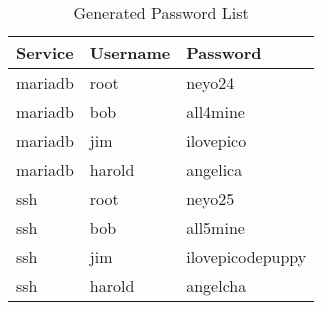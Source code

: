 \begin{table}[h!]
\centering
\begin{tabularx}{0.5\textwidth}{|>{\raggedright\arraybackslash}X|>{\raggedright\arraybackslash}X|>{\raggedright\arraybackslash}X|}
\hline
\textbf{Service} & \textbf{Username} & \textbf{Password} \\
\hline
mariadb & root    & neyo24           \\
mariadb & bob     & all4mine         \\
mariadb & jim     & ilovepico        \\
mariadb & harold  & angelica         \\
ssh     & root    & neyo25           \\
ssh     & bob     & all5mine         \\
ssh     & jim     & ilovepicodepuppy \\
ssh     & harold  & angelcha         \\
\hline
\end{tabularx}
\caption{Generated Password List}
\label{tab:envtools}
\end{table}
